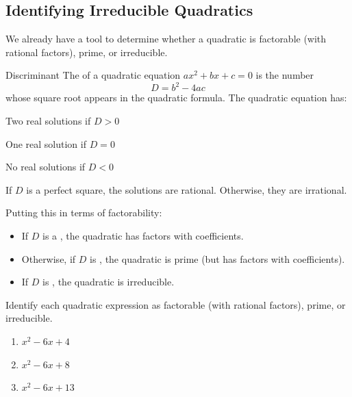 \subsection{Identifying Irreducible Quadratics}
We already have a tool to determine whether a quadratic is factorable (with rational factors), prime, or irreducible.
\begin{definition}{Discriminant}
The  of a quadratic equation $ax^2+bx+c=0$ is the number
$$D=b^2-4ac$$
whose square root appears in the quadratic formula. The quadratic equation has:
\begin{itemize*}
\item Two real solutions if $D>0$
\item One real solution if $D=0$
\item No real solutions if $D<0$
\end{itemize*}
If $D$ is a perfect square, the solutions are rational. Otherwise, they are irrational.
\end{definition}
Putting this in terms of factorability:
\begin{itemize}
\item If $D$ is a \makeblank, the quadratic has factors with \makeblank[1.5in] coefficients.
\item Otherwise, if $D$ is \makeblank[1.5in], the quadratic is prime (but has factors with \makeblank[1.5in] coefficients).
\item If $D$ is \makeblank[1.5in], the quadratic is irreducible.
\end{itemize}
\begin{Example}
Identify each quadratic expression as factorable (with rational factors), prime, or irreducible.
\begin{enumerate}\setabc
\item $x^2-6x+4$\makeblanknewf
\item $x^2-6x+8$\makeblanknewf
\item $x^2-6x+13$\makeblanknewf
\end{enumerate}
\end{Example}